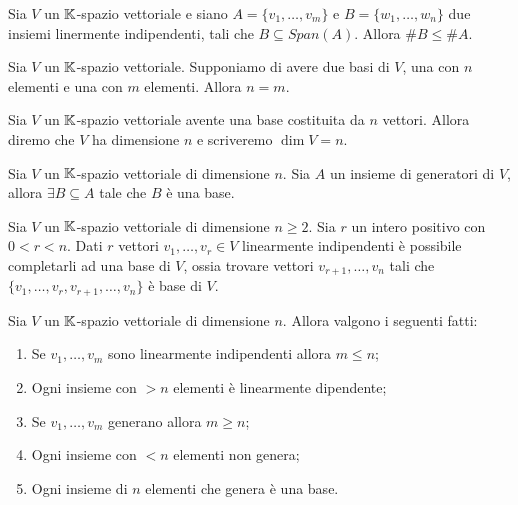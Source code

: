 \begin{corollary}
        Sia $ V $ un $ \mathbb{K} $-spazio vettoriale e siano $ A = \{v_1, \ldots, v_m\} $ e $ B = \{  w_1, \ldots, w_n \} $ due insiemi linermente indipendenti,
        tali che $ B \subseteq Span(A) $. Allora $ \#B \le \#A $.
\end{corollary}

\begin{thm}
        Sia $ V $ un $ \mathbb{K} $-spazio vettoriale. Supponiamo di avere due basi di $ V $, una con $ n $ elementi e una con $ m $ elementi. Allora $ n = m $.
\end{thm}

\begin{definition}[Dimensione]
	Sia $ V $ un $ \mathbb{K} $-spazio vettoriale avente una base costituita da $ n $ vettori. Allora diremo che $ V $ ha dimensione $ n $ e 
	scriveremo $ \dim{V} = n $.
\end{definition}

\begin{thm} 
	Sia $ V $ un $ \mathbb{K} $-spazio vettoriale di dimensione $ n $. Sia $A$ un insieme di generatori di $V$, allora $\exists B \subseteq A$ tale che $B$ è una base.
\end{thm}

\begin{thm}
        Sia $ V $ un $ \mathbb{K} $-spazio vettoriale di dimensione $ n \geq 2 $. Sia $ r $ un intero positivo con $ 0 < r < n $. 
        Dati $ r $ vettori $ v_1, \ldots , v_r \in V $ linearmente indipendenti è possibile completarli ad una base di $ V $, 
        ossia trovare vettori $ v_{r+1}, \ldots, v_n $ tali che $ \{v_1, \ldots , v_r, v_{r+1}, \ldots , v_n\} $ è base di $ V $.
\end{thm}

\begin{prop}
	Sia $ V $ un $ \mathbb{K} $-spazio vettoriale di dimensione $ n $. Allora valgono i seguenti fatti:
	\begin{enumerate}[label=(\roman*)]
                \item Se $ v_1, \ldots, v_m $ sono linearmente indipendenti allora $m \le n$;
                \item Ogni insieme con $>n$ elementi è linearmente dipendente;
                \item Se $ v_1, \ldots, v_m $ generano allora $m \ge n$;
		\item Ogni insieme con $<n$ elementi non genera;
		\item Ogni insieme di $n$ elementi che genera è una base.
        \end{enumerate}
\end{prop}


